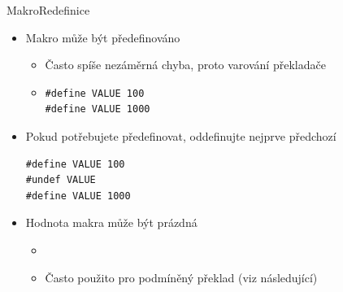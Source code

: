 \begin{frame}[fragile]{Makro}{Redefinice}

  \begin{itemize}
    \item Makro může být předefinováno
    \begin{itemize}
      \item Často spíše nezáměrná chyba, proto varování překladače
      \item {}

\begin{lstlisting}
#define VALUE 100
#define VALUE 1000
\end{lstlisting}
    \end{itemize}

    \pause

    \item Pokud potřebujete předefinovat, oddefinujte nejprve předchozí
\begin{lstlisting}
#define VALUE 100
#undef VALUE
#define VALUE 1000
\end{lstlisting}

    \pause

    \item Hodnota makra může být prázdná
    \begin{itemize}
      \item {}
      \item Často použito pro podmíněný překlad (viz následující)
    \end{itemize}

  \end{itemize}

\end{frame}

